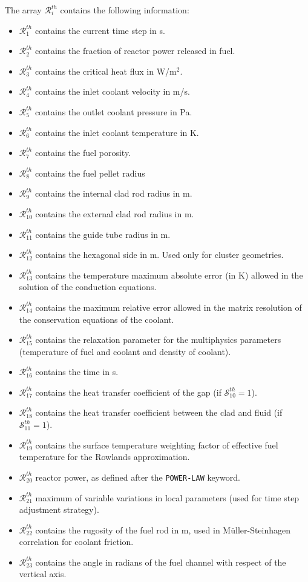 The array $\mathcal{R}^{th}_{i}$ contains the following information: 

\begin{itemize}
\item $\mathcal{R}^{th}_{1}$ contains the current time step in s. 
\item $\mathcal{R}^{th}_{2}$ contains the fraction of reactor power released in fuel.
\item $\mathcal{R}^{th}_{3}$ contains the critical heat flux in W/m$^2$.
\item $\mathcal{R}^{th}_{4}$ contains the inlet coolant velocity in m/s.
\item $\mathcal{R}^{th}_{5}$ contains the outlet coolant pressure in Pa.
\item $\mathcal{R}^{th}_{6}$ contains the inlet coolant temperature in K.
\item $\mathcal{R}^{th}_{7}$ contains the fuel porosity.
\item $\mathcal{R}^{th}_{8}$ contains the fuel pellet radius
\item $\mathcal{R}^{th}_{9}$ contains the internal clad rod radius in m.
\item $\mathcal{R}^{th}_{10}$ contains the external clad rod radius in m.
\item $\mathcal{R}^{th}_{11}$ contains the guide tube radius in m.
\item $\mathcal{R}^{th}_{12}$ contains the hexagonal side in m. Used only for cluster geometries.
\item $\mathcal{R}^{th}_{13}$ contains the temperature maximum absolute error (in K) allowed in the solution of the conduction equations.
\item $\mathcal{R}^{th}_{14}$ contains the maximum relative error allowed in the matrix resolution of the conservation equations of the coolant.
\item $\mathcal{R}^{th}_{15}$ contains the relaxation parameter for the multiphysics parameters (temperature of fuel and coolant  and density of coolant).
\item $\mathcal{R}^{th}_{16}$ contains the time in s.
\item $\mathcal{R}^{th}_{17}$ contains the heat transfer coefficient of the gap (if $\mathcal{S}^{th}_{10}=1$).
\item $\mathcal{R}^{th}_{18}$ contains the heat transfer coefficient between the clad and fluid (if $\mathcal{S}^{th}_{11}=1$).
\item $\mathcal{R}^{th}_{19}$ contains the surface temperature weighting factor of effective fuel temperature for the Rowlands approximation.
\item $\mathcal{R}^{th}_{20}$ reactor power, as defined after the {\tt POWER-LAW} keyword.
\item $\mathcal{R}^{th}_{21}$ maximum of variable variations in local parameters (used for time step adjustment strategy).
\item $\mathcal{R}^{th}_{22}$ contains the rugosity of the fuel rod in m, used in M\"uller-Steinhagen correlation for coolant friction.
\item $\mathcal{R}^{th}_{23}$ contains the angle in radians of the fuel channel with respect of the vertical axis.
\end{itemize}

